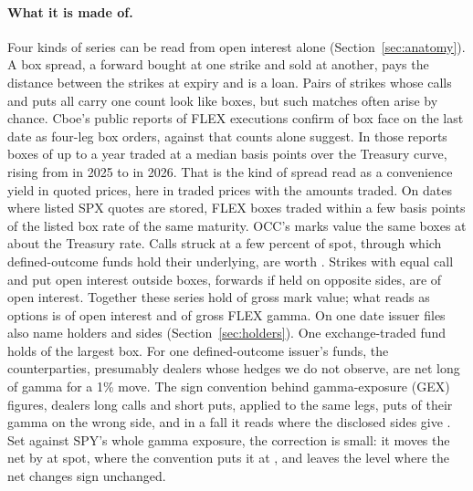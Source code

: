 \documentclass[11pt]{article}
\begin{document}
\paragraph{What it is made of.} Four kinds of series can be read from open interest
alone (Section~\ref{sec:anatomy}). A box spread, a forward bought at one strike and sold
at another, pays the distance between the strikes at expiry and is a loan. Pairs of
strikes whose calls and puts all carry one count look like boxes, but such matches often
arise by chance. Cboe's public reports of FLEX executions confirm \BoxRTradedFace{} of
box face on the last date as four-leg box orders, against \AnatBoxFace{} that counts
alone suggest. In those reports \BoxRHeadlineTrades{} boxes of up to a year traded at a
median \BoxRSpreadMedian{} basis points over the Treasury curve, rising from
\BoxRYearTwentyTwentyFive{} in 2025 to \BoxRYearTwentyTwentySix{} in 2026. That is the
kind of spread \citet{binsbergen2022} read as a convenience yield in quoted prices, here
in traded prices with the amounts traded. On dates where listed SPX quotes are stored,
FLEX boxes traded within a few basis points of the listed box rate of the same maturity.
OCC's marks value the same boxes at about the Treasury rate. Calls struck at a few percent of spot, through
which defined-outcome funds hold their underlying, are worth \AnatStockValue{}. Strikes
with equal call and put open interest outside boxes, forwards if held on opposite sides,
are \AnatPairOIShare{} of open interest. Together these series hold
\AnatFinancingValueShare{} of gross mark value; what reads as options is
\AnatOptionOIShare{} of open interest and \AnatGammaOptions{} of gross FLEX gamma. On one
date issuer files also name holders and sides (Section~\ref{sec:holders}). One
exchange-traded fund holds \HoldBoxShareOfItsBox{} of the largest box. For one
defined-outcome issuer's funds, the counterparties, presumably dealers whose hedges we do
not observe, are net long \HoldGammaNet{} of gamma for a 1\% move. The sign convention
behind gamma-exposure (GEX) figures, dealers long calls and short puts, applied to the
same legs, puts \HoldGammaWrong{} of their gamma on the wrong side, and in a
\HoldProfileDrop{} fall it reads \HoldProfileDropConvention{} where the disclosed sides
give \HoldProfileDropDealer{}. Set against SPY's whole gamma exposure, the correction is
small: it moves the net by \GexSigningSpot{} at spot, where the convention puts it at
\GexConventionSpot{}, and leaves the level where the net changes sign unchanged.
\end{document}
